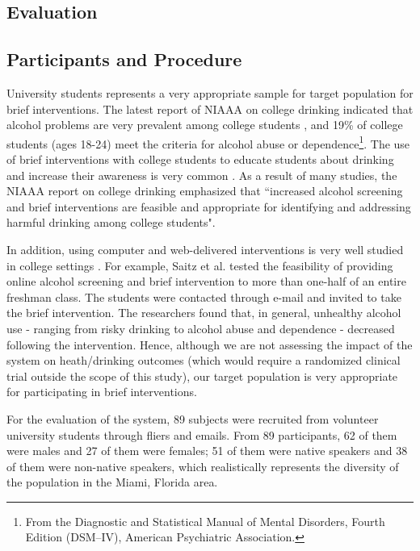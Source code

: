 \begin{sloppy}
\section{Evaluation}

\subsection{Participants and Procedure}
University students represents a very appropriate sample for target population for brief interventions. The latest report of NIAAA on college drinking indicated that alcohol problems are very prevalent among college students \cite{NIAAA2007colleges}, and 19\% of college students (ages 18-24) meet the criteria for alcohol abuse or dependence\footnote{From the Diagnostic and Statistical Manual of Mental Disorders, Fourth Edition (DSM–IV), American Psychiatric Association.}. The use of brief interventions with college students to educate students about drinking and  increase their awareness is very common \cite{NIAAA2007colleges}. As a result of many studies, the NIAAA report on college drinking emphasized that ``increased alcohol screening and brief interventions are feasible  and appropriate for identifying and addressing harmful drinking among college students". 

In addition, using computer and web-delivered interventions is very well studied in college settings \cite{walters2005demon,walters2005feedback,saitz2007screening}. For example, Saitz et al. \cite{saitz2007screening} tested the feasibility of providing online alcohol screening and brief intervention to more than one-half of an entire freshman class. The students were contacted through e-mail and invited to take the brief intervention. The researchers found that, in general, unhealthy alcohol use - ranging from risky drinking to alcohol abuse and dependence - decreased following the intervention. Hence, although we are not assessing the impact of the system on heath/drinking outcomes (which would require a randomized clinical trial outside the scope of this study), our target population is very appropriate for participating in brief interventions.

For the evaluation of the system, 89 subjects were recruited from volunteer university students through fliers and emails.  From 89 participants, 62 of them were males and 27 of them were females; 51 of them were native speakers and 38 of them were non-native speakers,   which realistically represents the diversity of the population in the Miami, Florida area.  


\end{sloppy}
